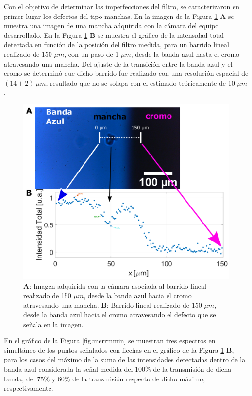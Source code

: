 Con el objetivo de determinar las imperfecciones del filtro, se caracterizaron en primer lugar los defectos del tipo manchas. En la imagen de la Figura \ref{fig:barinted} \textbf{A} se muestra una imagen de una mancha adquirida con la cámara del equipo desarrollado. En la Figura \ref{fig:barinted} \textbf{B} se muestra el gráfico de la intensidad total detectada en función de la posición del filtro medida, para un barrido lineal realizado de 150 $\mu m$, con un paso de 1 $\mu m$, desde la banda azul hasta el cromo atravesando una mancha. Del ajuste de la transición entre la banda azul y el cromo se determinó que dicho barrido fue realizado con una resolución espacial de $(14 \pm 2)~\mu m$, resultado que no se solapa con el estimado teóricamente de 10 $\mu m$.

 \begin{figure}[H]
	\centering
	\includegraphics[width=1.0\textwidth]{Figs/microespectrometro/manchacondetalles.png}
	\caption{\textbf{A}: Imagen adquirida con la cámara asociada al barrido lineal realizado de 150 $\mu m$, desde la banda azul hacia el cromo atravesando una mancha. \textbf{B}: Barrido lineal realizado de 150 $\mu m$, desde la banda azul hacia el cromo atravesando el defecto que se señala en la imagen.}
	\label{fig:barinted}
\end{figure}


En el gráfico de la Figura \ref{fig:merrmmin} se muestran tres espectros en simultáneo de los puntos señalados con flechas en el gráfico de la Figura \ref{fig:barinted} \textbf{B}, para los casos del máximo de la suma de las intensidades detectadas dentro de la banda azul considerada la señal medida del 100\% de la transmisión de dicha banda, del 75\% y 60\% de la transmisión respecto de dicho máximo, respectivamente. 


